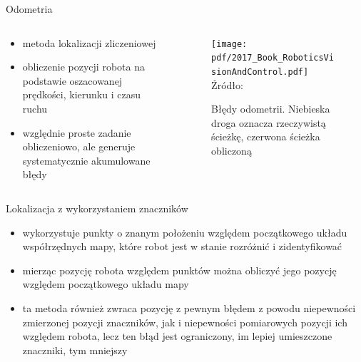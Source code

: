 \begin{frame}
{Odometria}
	\begin{columns}
		\begin{column}{0.45\textwidth}
			\begin{itemize}
				\item metoda lokalizacji zliczeniowej
				\item obliczenie pozycji robota na podstawie oszacowanej prędkości, kierunku i czasu ruchu
				\item względnie proste zadanie obliczeniowo, ale generuje systematycznie akumulowane błędy
			\end{itemize}
		\end{column}
		\begin{column}{0.55\textwidth}  %
			\begin{figure}
				\begin{center}
					\texttt{[image: pdf/2017\_Book\_RoboticsVisionAndControl.pdf]}
					\hspace*{15pt}\hbox{\scriptsize{Źródło:}}
					\caption{Błędy odometrii. Niebieska droga oznacza rzeczywistą ścieżkę, czerwona ścieżka obliczoną }
				\end{center}
			\end{figure}
		\end{column}
	\end{columns}
\end{frame}

\begin{frame}
{Lokalizacja z wykorzystaniem znaczników}
	\begin{itemize}
		\item wykorzystuje punkty o znanym położeniu względem początkowego układu współrzędnych mapy, które robot jest w stanie rozróżnić i zidentyfikować
		\item mierząc pozycję robota względem punktów można obliczyć jego pozycję względem początkowego układu mapy
		\item ta metoda również zwraca pozycję z pewnym błędem z powodu niepewności zmierzonej pozycji znaczników, jak i niepewności pomiarowych pozycji ich względem robota, lecz ten błąd jest ograniczony, im lepiej umieszczone znaczniki, tym mniejszy
	\end{itemize}
\end{frame}

